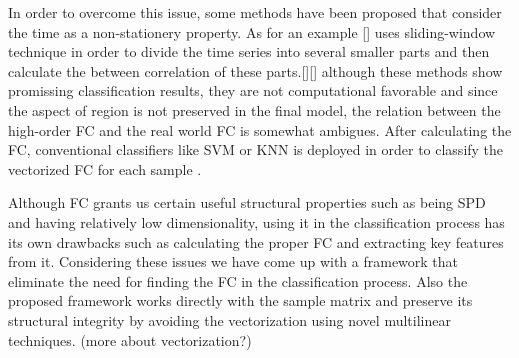 \documentclass[journal]{IEEEtran}
\begin{document}
	In order to overcome this issue, some methods have been proposed that consider the time as a non-stationery property. As for an example [] uses sliding-window technique in order to divide the time series into several smaller parts and then calculate the between correlation of these parts.[][] although these methods show promissing classification results, they are not computational favorable and since the aspect of region is not preserved in the final model, the relation between the high-order FC and the real world FC is somewhat ambigues. After calculating the FC, conventional classifiers like SVM or KNN is deployed in order to classify the vectorized FC for each sample \cite{r20}. 
	
	Although FC grants us certain useful structural properties such as being SPD and having relatively low dimensionality, using  it in the classification process has its own drawbacks such as calculating the proper FC and extracting key features from it. Considering these issues we have come up with a framework that eliminate the need for finding the FC in the classification process. Also the proposed framework works directly with the sample matrix and preserve its structural integrity by avoiding the vectorization using novel multilinear techniques.    
	(more about vectorization?)
	
\end{document}
